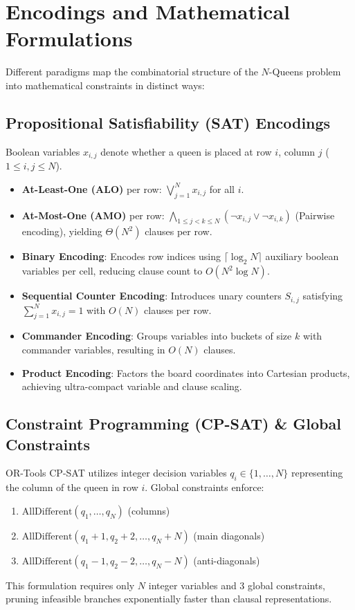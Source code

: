 \documentclass[a4paper,fleqn]{cas-sc}
\begin{document}
\section{Encodings and Mathematical Formulations}
Different paradigms map the combinatorial structure of the $N$-Queens problem into mathematical constraints in distinct ways:

\subsection{Propositional Satisfiability (SAT) Encodings}
Boolean variables $x_{i,j}$ denote whether a queen is placed at row $i$, column $j$ ($1 \le i, j \le N$).
\begin{itemize}
    \item \textbf{At-Least-One (ALO)} per row: $\bigvee_{j=1}^N x_{i,j}$ for all $i$.
    \item \textbf{At-Most-One (AMO)} per row: $\bigwedge_{1 \le j < k \le N} (\neg x_{i,j} \lor \neg x_{i,k})$ (Pairwise encoding), yielding $\Theta(N^2)$ clauses per row.
    \item \textbf{Binary Encoding}: Encodes row indices using $\lceil \log_2 N \rceil$ auxiliary boolean variables per cell, reducing clause count to $O(N^2 \log N)$.
    \item \textbf{Sequential Counter Encoding}: Introduces unary counters $S_{i,j}$ satisfying $\sum_{j=1}^N x_{i,j} = 1$ with $O(N)$ clauses per row.
    \item \textbf{Commander Encoding}: Groups variables into buckets of size $k$ with commander variables, resulting in $O(N)$ clauses.
    \item \textbf{Product Encoding}: Factors the board coordinates into Cartesian products, achieving ultra-compact variable and clause scaling.
\end{itemize}

\subsection{Constraint Programming (CP-SAT) \& Global Constraints}
OR-Tools CP-SAT utilizes integer decision variables $q_i \in \{1, \dots, N\}$ representing the column of the queen in row $i$. Global constraints enforce:
\begin{enumerate}
    \item $\text{AllDifferent}(q_1, \dots, q_N)$ (columns)
    \item $\text{AllDifferent}(q_1 + 1, q_2 + 2, \dots, q_N + N)$ (main diagonals)
    \item $\text{AllDifferent}(q_1 - 1, q_2 - 2, \dots, q_N - N)$ (anti-diagonals)
\end{enumerate}
This formulation requires only $N$ integer variables and 3 global constraints, pruning infeasible branches exponentially faster than clausal representations.
\end{document}

